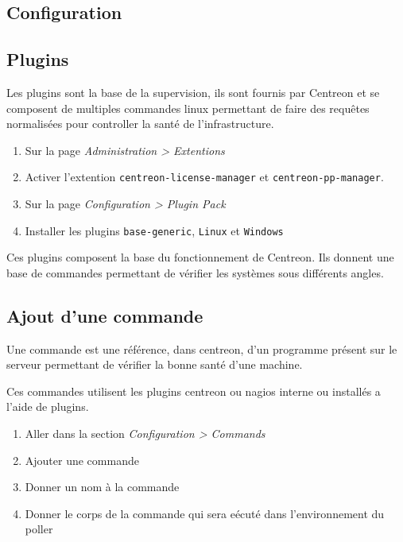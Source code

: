 	\subsection{Configuration}

		\subsection{Plugins}

		Les plugins sont la base de la supervision, ils sont fournis par Centreon et se composent de multiples commandes linux permettant de faire des requêtes normalisées pour controller la santé de l'infrastructure.

		\begin{enumerate}
			\item Sur la page \emph{Administration > Extentions}
			\item Activer l'extention \texttt{centreon-license-manager} et \texttt{centreon-pp-manager}.
			\item Sur la page \emph{Configuration > Plugin Pack}
			\item Installer les plugins \texttt{base-generic}, \texttt{Linux} et \texttt{Windows}
		\end{enumerate}

		Ces plugins composent la base du fonctionnement de Centreon.
		Ils donnent une base de commandes permettant de vérifier les systèmes sous différents angles.

		\subsection{Ajout d'une commande}

		Une commande est une référence, dans centreon, d'un programme présent sur le serveur permettant de vérifier la bonne santé d'une machine.

		Ces commandes utilisent les plugins centreon ou nagios interne ou installés a l'aide de plugins.

		\begin{enumerate}
			\item Aller dans la section \emph{Configuration > Commands}
			\item Ajouter une commande
			\item Donner un nom à la commande
			\item Donner le corps de la commande qui sera eécuté dans l'environnement du poller
		\end{enumerate}

